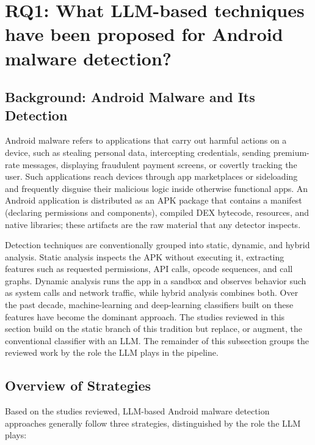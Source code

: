 \section{RQ1: What LLM-based techniques have been proposed
for Android malware detection?}\label{sec:rq1}

\subsection{Background: Android Malware and Its Detection}

Android malware refers to applications that carry out harmful actions on a device, such as stealing personal data, intercepting credentials, sending premium-rate messages, displaying fraudulent payment screens, or covertly tracking the user. Such applications reach devices through app marketplaces or sideloading and frequently disguise their malicious logic inside otherwise functional apps. An Android application is distributed as an APK package that contains a manifest (declaring permissions and components), compiled DEX bytecode, resources, and native libraries; these artifacts are the raw material that any detector inspects.

Detection techniques are conventionally grouped into static, dynamic, and hybrid analysis. Static analysis inspects the APK without executing it, extracting features such as requested permissions, API calls, opcode sequences, and call graphs. Dynamic analysis runs the app in a sandbox and observes behavior such as system calls and network traffic, while hybrid analysis combines both. Over the past decade, machine-learning and deep-learning classifiers built on these features have become the dominant approach. The studies reviewed in this section build on the static branch of this tradition but replace, or augment, the conventional classifier with an LLM. The remainder of this subsection groups the reviewed work by the role the LLM plays in the pipeline.

\subsection{Overview of Strategies}

Based on the studies reviewed, LLM-based Android malware detection approaches generally follow three strategies, distinguished by the role the LLM plays:

